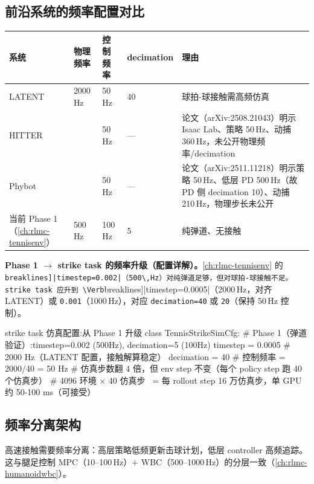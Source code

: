 \subsection{前沿系统的频率配置对比}

\begin{center}
\small
\begin{tabularx}{\linewidth}{@{}llllL@{}}
\toprule
系统 & 物理频率 & 控制频率 & decimation & 理由 \\
\midrule
LATENT & 2000\,Hz & 50\,Hz & 40 & 球拍-球接触需高频仿真 \\
HITTER &  & 50\,Hz & — & 论文（arXiv:2508.21043）明示 Isaac Lab、策略 50\,Hz、动捕 360\,Hz，未公开物理频率/decimation \\
Phybot &  & 50\,Hz & — & 论文（arXiv:2511.11218）明示策略 50\,Hz、低层 PD 500\,Hz（故 PD 侧 decimation 10）、动捕 210\,Hz，物理步长未公开 \\
当前 Phase 1（\cref{ch:rlmc-tennisenv}） & 500\,Hz & 100\,Hz & 5 & 纯弹道、无接触 \\
\bottomrule
\end{tabularx}
\end{center}

\textbf{Phase 1 $\to$ strike task 的频率升级（配置详解）。}\cref{ch:rlmc-tennisenv} 的 \Verb[breaklines]|timestep=0.002|（500\,Hz）对纯弹道足够，但对球拍-球接触不足。strike task 应升到 \Verb[breaklines]|timestep=0.0005|（2000\,Hz，对齐 LATENT）或 \verb|0.001|（1000\,Hz），对应 \verb|decimation=40| 或 \verb|20|（保持 50\,Hz 控制）。

\begin{codebox}[Python]{strike task 仿真配置:从 Phase 1 升级}
class TennisStrikeSimCfg:
    # Phase 1（弹道验证）:timestep=0.002 (500Hz), decimation=5 (100Hz)
    timestep = 0.0005    # 2000 Hz（LATENT 配置，接触解算稳定）
    decimation = 40      # 控制频率 = 2000/40 = 50 Hz
    # 仿真步数翻 4 倍，但 env step 不变（每个 policy step 跑 40 个仿真步）
    # 4096 环境 × 40 仿真步 ~= 每 rollout step 16 万仿真步，单 GPU 约 50-100 ms（可接受）
\end{codebox}

\subsection{频率分离架构}

高速接触需要频率分离：高层策略低频更新击球计划，低层 controller 高频追踪。这与腿足控制 MPC（10--100\,Hz）$+$ WBC（500--1000\,Hz）的分层一致（\cref{ch:rlmc-humanoidwbc}）。


